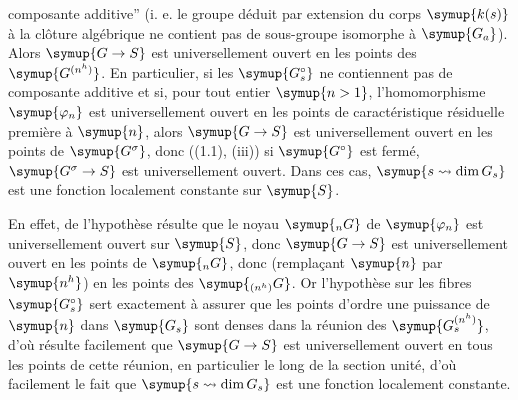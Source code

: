 composante additive'' (i. e. le groupe déduit par extension du corps $\symup{k(s)}$ à la
clôture algébrique ne contient pas de sous-groupe isomorphe à $\symup{G_a}$). Alors $\symup{G\to  S}$ est universellement ouvert en les
points des $\symup{G^{(n^h)}}$. En particulier, si les $\symup{G_s^\circ}$ ne contiennent pas
de composante additive et si, pour tout entier $\symup{n>1}$, l'homomorphisme
$\symup{\varphi_n}$ est universellement ouvert en les points de caractéristique
résiduelle première à $\symup{n}$,
alors $\symup{G\to  S}$ est universellement ouvert en les points de
$\symup{G^\sigma}$, donc ((1.1), (iii)) si $\symup{G^\circ}$ est fermé,
$\symup{G^\sigma\to  S}$ est universellement ouvert. Dans ces cas,
$\symup{s\rightsquigarrow\dim G_s}$ est une fonction localement constante sur $\symup{S}$.

En effet, de l'hypothèse résulte que le noyau $\symup{{}_nG}$ de $\symup{\varphi_n}$ est
universellement ouvert sur $\symup{S}$, donc $\symup{G\to  S}$ est universellement
ouvert en les points de $\symup{{}_nG}$, donc (remplaçant $\symup{n}$ par $\symup{n^h}$) en les points
des $\symup{{}_{(n^h)}G}$. Or l'hypothèse sur les fibres $\symup{G_s^\circ}$ sert exactement à assurer que les points d'ordre une puissance de $\symup{n}$
dans $\symup{G_s}$ sont denses dans la réunion des $\symup{G_s^{(n^h)}}$, d'où résulte facilement que
$\symup{G\to  S}$ est universellement ouvert en tous les points de cette
réunion, en particulier le long de la section unité, d'où facilement le fait
que $\symup{s\rightsquigarrow\dim G_s}$ est une fonction localement constante.

